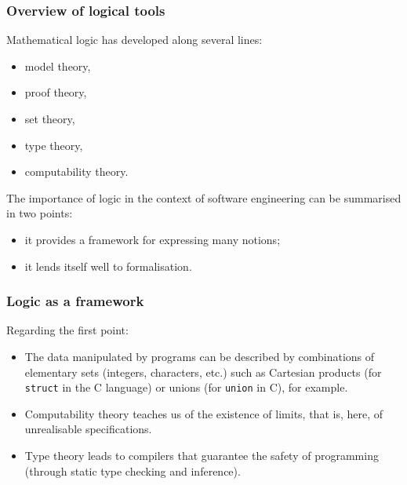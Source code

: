 \documentclass[compress,dvipdfmx]{beamer}
\begin{document}
%
\begin{frame}
\frametitle{Overview of logical tools}

Mathematical logic has developed along several lines:
\begin{itemize}

  \item model theory,

  \item proof theory,

  \item set theory,

  \item type theory,

  \item computability theory.

\end{itemize}
The importance of logic in the context of software engineering can
be summarised in two points:
\begin{itemize}

  \item it provides a framework for expressing many notions;

  \item it lends itself well to formalisation.

\end{itemize}

\end{frame}

%
\begin{frame}
\frametitle{Logic as a framework}

Regarding the first point:
\begin{itemize}

  \item The data manipulated by programs can be described by
  combinations of elementary sets (integers, characters, etc.) such
  as Cartesian products (for \texttt{struct} in the \textsf{C}
  language) or unions (for \texttt{union} in \textsf{C}), for
  example.

  \item Computability theory teaches us of the existence of limits,
  that is, here, of unrealisable specifications.

  \item Type theory leads to compilers that guarantee the safety of
  programming (through static type checking and inference).

\end{itemize}

\end{frame}
\end{document}
